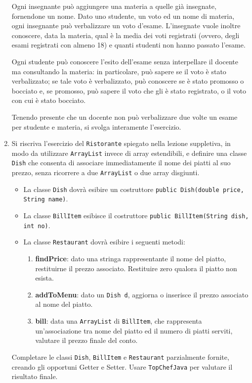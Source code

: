 \documentclass[]{scrartcl}
\begin{document}
\begin{enumerate}
Ogni insegnante può aggiungere una materia a quelle già insegnate, fornendone un nome. Dato uno studente, un voto ed un nome di materia, ogni insegnante può verbalizzare un voto d'esame. L'insegnate vuole inoltre conoscere, data la materia, qual è la media dei voti registrati (ovvero, degli esami registrati con almeno 18) e quanti studenti non hanno passato l'esame. 

Ogni studente può conoscere l'esito dell'esame senza interpellare il docente ma consultando la materia: in particolare, può sapere se il voto è stato verbalizzato; se tale voto è verbalizzato, può conoscere se è stato promosso o bocciato e, se promosso, può sapere il voto che gli è stato registrato, o il voto con cui è stato bocciato.

Tenendo presente che un docente non può verbalizzare due volte un esame per studente e materia, si svolga interamente l'esercizio.

\item Si riscriva l'esercizio del \texttt{Ristorante} spiegato nella lezione suppletiva, in modo da utilizzare \texttt{ArrayList} invece di array estendibili, e definire una classe \texttt{Dish} che consenta di associare immediatamente il nome dei piatti al suo prezzo, senza ricorrere a due \texttt{ArrayList} o due array disgiunti. 
\begin{itemize}
	\item La classe \texttt{Dish} dovrà esibire un costruttore \texttt{public Dish(double price, String name)}.
	\item La classe \texttt{BillItem} esibisce il costruttore \texttt{public BillItem(String dish, int no)}.
	\item La classe \texttt{Restaurant} dovrà esibire i seguenti metodi:
	\begin{enumerate}
		\item \textbf{findPrice}: dato una stringa rappresentante il nome del piatto, restituirne il prezzo associato. Restituire zero qualora il piatto non esista.
		\item \textbf{addToMenu}: dato un \texttt{Dish d}, aggiorna o inserisce il prezzo associato al nome del piatto.
		\item \textbf{bill}: data una \texttt{ArrayList} di \texttt{BillItem}, che rappresenta un'associazione tra nome del piatto ed il numero di piatti serviti, valutare il prezzo finale del conto.
	\end{enumerate}
\end{itemize}
Completare le classi \texttt{Dish}, \texttt{BillItem} e \texttt{Restaurant} parzialmente fornite, creando gli opportuni Getter e Setter. Usare \texttt{TopChefJava} per valutare il risultato finale.


\end{enumerate}
\end{document}
